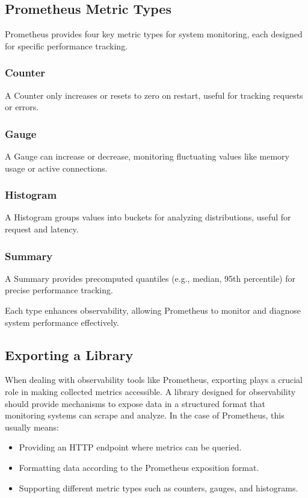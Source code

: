\documentclass[a4paper,twoside,11pt]{article}
\begin{document}
\subsection{Prometheus Metric Types}
Prometheus provides four key metric types for system monitoring, each designed for specific performance tracking.

\subsubsection{Counter}
A Counter only increases or resets to zero on restart, useful for tracking requests or errors.

\subsubsection{Gauge}
A Gauge can increase or decrease, monitoring fluctuating values like memory usage or active connections.

\subsubsection{Histogram}
A Histogram groups values into buckets for analyzing distributions, useful for request and latency.

\subsubsection{Summary}
A Summary provides precomputed quantiles (e.g., median, 95th percentile) for precise performance tracking.

Each type enhances observability, allowing Prometheus to monitor and diagnose system performance effectively.

\subsection{Exporting a Library}
When dealing with observability tools like Prometheus, exporting plays a crucial role in making collected metrics accessible. A library designed for observability should provide mechanisms to expose data in a structured format that monitoring systems can scrape and analyze. In the case of Prometheus, this usually means:
\begin{itemize}
    \item Providing an HTTP endpoint where metrics can be queried.
    \item Formatting data according to the Prometheus exposition format.
    \item Supporting different metric types such as counters, gauges, and histograms.
\end{itemize}
\end{document}
